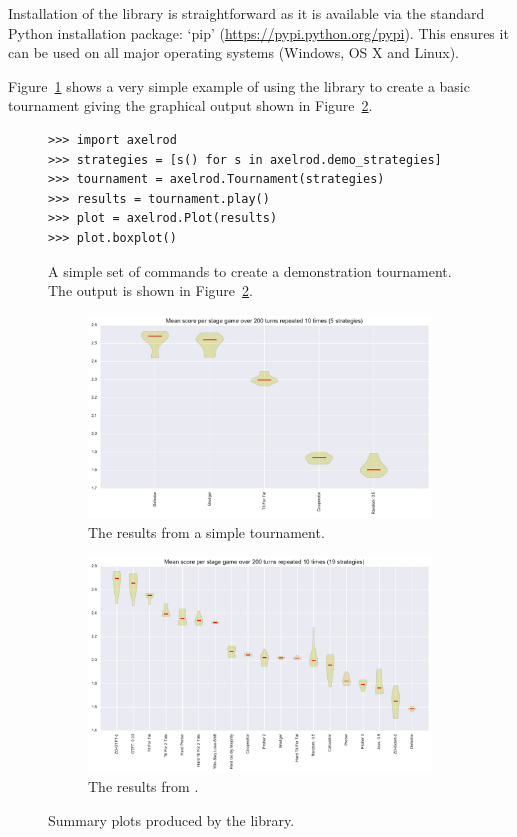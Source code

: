 \documentclass{jors}
\begin{document}
Installation of the library is straightforward as it is available via the
standard Python installation package: `pip'
(\url{https://pypi.python.org/pypi}). This ensures it can be used on all major
operating systems (Windows, OS X and Linux).

Figure~\ref{fig:demo_tournament_commands} shows a very simple example of using
the library to create a basic tournament giving the graphical output shown in
Figure~\ref{fig:demo_tournament}.

\begin{figure}[!hbtp]
    \begin{verbatim}
>>> import axelrod
>>> strategies = [s() for s in axelrod.demo_strategies]
>>> tournament = axelrod.Tournament(strategies)
>>> results = tournament.play()
>>> plot = axelrod.Plot(results)
>>> plot.boxplot()
    \end{verbatim}
    \caption{A simple set of commands to create a demonstration tournament. The
        output is shown in Figure~\ref{fig:demo_tournament}.}
    \label{fig:demo_tournament_commands}
\end{figure}

\begin{figure}[!hbtp]
	\begin{subfigure}{.5\textwidth}
		\centering
		\includegraphics[width=.75\textwidth]{../img/demo_tournament.pdf}
		\caption{The results from a simple tournament.}
		\label{fig:demo_tournament}
	\end{subfigure}
	\begin{subfigure}{.5\textwidth}
		\centering
		\includegraphics[width=.75\textwidth]{../img/stewart_tournament.pdf}
		\caption{The results from \cite{Stewart2012}.}
		\label{fig:stewart_tournament}
	\end{subfigure}
	\caption{Summary plots produced by the library.}
\end{figure}
\end{document}
